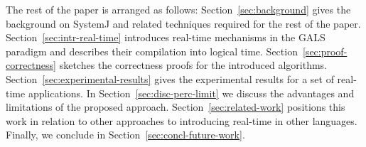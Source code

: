 The rest of the paper is arranged as follows:
Section~\ref{sec:background} gives the background on SystemJ and related
techniques required for the rest of the paper.
Section~\ref{sec:intr-real-time} introduces real-time mechanisms in the
GALS paradigm and describes their compilation into logical time.
Section~\ref{sec:proof-correctness} sketches the correctness proofs for
the introduced algorithms. Section~\ref{sec:experimental-results} gives
the experimental results for a set of real-time applications. In
Section~\ref{sec:disc-perc-limit} we discuss the advantages and
limitations of the proposed approach. Section~\ref{sec:related-work}
positions this work in relation to other approaches to introducing
real-time in other languages. Finally, we conclude in
Section~\ref{sec:concl-future-work}.



